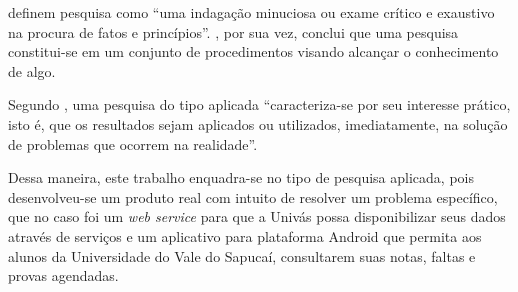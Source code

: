 	
	\par {} definem pesquisa como “uma indagação minuciosa
ou exame crítico e exaustivo na procura de fatos e princípios”.
, por sua vez, conclui que uma pesquisa constitui-se
em um conjunto de procedimentos visando alcançar o conhecimento de algo.

	\par Segundo , uma pesquisa do tipo aplicada
“caracteriza-se por seu interesse prático, isto é, que os resultados sejam
aplicados ou utilizados, imediatamente, na solução de problemas que ocorrem na
realidade”.

	\par Dessa maneira, este trabalho enquadra-se no tipo de pesquisa aplicada,
pois desenvolveu-se um produto real com intuito de resolver um problema específico,
que no caso foi um \textit{web service} para que a Univás possa disponibilizar
seus dados através de serviços e um aplicativo para plataforma Android que
permita aos alunos da Universidade do Vale do Sapucaí, consultarem suas notas,
faltas e provas agendadas.
